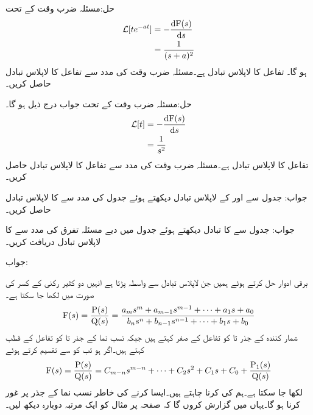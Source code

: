 حل:مسئلہ ضرب وقت کے  تحت
\begin{align*}
\Laplace[te^{-at}] &=-\frac{\dif \bF(s)}{\dif s}\\
&=\frac{1}{(s+a)^2}
\end{align*}
ہو گا۔
تفاعل  کا لاپلاس تبادل  ہے۔مسئلہ ضرب وقت کی مدد سے تفاعل  کا  لاپلاس تبادل حاصل کریں۔

حل:مسئلہ ضرب وقت کے تحت جواب درج ذیل ہو گا۔
\begin{align*}
\Laplace[t]&=-\frac{\dif \bF(s)}{\dif s}\\
&=\frac{1}{s^2}
\end{align*}
تفاعل  کا لاپلاس تبادل  ہے۔مسئلہ ضرب وقت کی مدد سے تفاعل  کا لاپلاس تبادل حاصل کریں۔

جواب:
جدول  سے  اور  کے لاپلاس تبادل دیکھتے ہوئے جدول   کی مدد سے  کا لاپلاس تبادل حاصل کریں۔

جواب:
جدول  سے  کا تبادل دیکھتے ہوئے جدول   میں دیے مسئلہ تفرق کی مدد سے  کا لاپلاس تبادل دریافت کریں۔

جواب:

برقی ادوار حل کرتے ہوئے ہمیں جن لاپلاس تبادل سے واسطہ پڑتا ہے انہیں دو کثیر رکنی کے کسر کی صورت میں لکھا جا سکتا ہے۔
\begin{align}\label{مساوات_لاپلاس_عمومی_الف}
{\ensuremath{{\textup{F}}}}(s)=\frac{{{\textup{P}}}(s)}{{{\textup{Q}}}(s)}=\frac{a_m s^m+a_{m-1} s^{m-1}+\cdots+a_1 s+a_0}{b_n s^n+b_{n-1} s^{n-1}+\cdots+b_1 s+b_0}
\end{align}
شمار کنندہ  کے جذر  تا   کو تفاعل کے صفر کہتے ہیں جبکہ نسب نما  کے جذر   تا  کو تفاعل کے قطب کہتے ہیں۔اگر  ہو تب  کو  سے تقسیم کرتے ہوئے
\begin{align}\label{مساوات_لاپلاس_عمومی_ب}
{\ensuremath{{\textup{F}}}}(s)=\frac{{{\textup{P}}}(s)}{{{\textup{Q}}}(s)}=C_{m-n}s^{m-n}+\cdots+C_2 s^2+C_1 s+C_0+\frac{{{\textup{P}}}_1(s)}{{{\textup{Q}}}(s)}
\end{align}
لکھا جا سکتا ہے۔ہم  کی  کرنا چاہتے ہیں۔ایسا کرنے کی خاطر نسب نما  کے جذر پر غور کرنا ہو گا۔یہاں میں گزارش کروں گا کہ صفحہ  پر مثال  کو ایک مرتبہ دوبارہ دیکھ لیں۔

